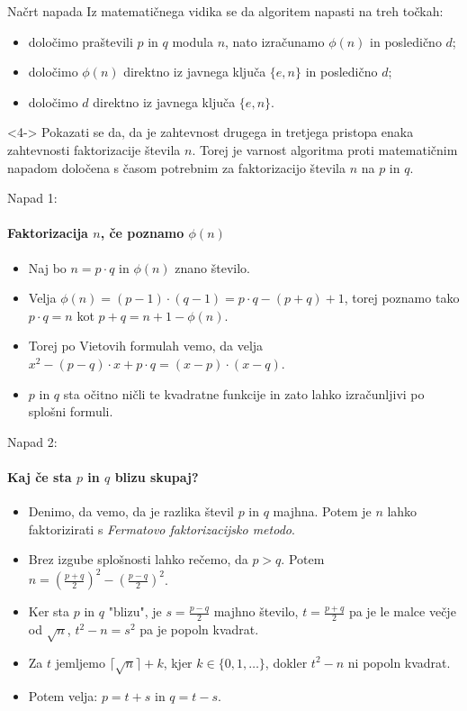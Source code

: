 \documentclass[a4paper, 12pt]{beamer} %
\begin{document}
\begin{frame}{Načrt napada}
Iz matematičnega vidika se da algoritem napasti na treh točkah:
\begin{itemize}[label=]
\item<1-> določimo praštevili $p$ in $q$ modula $n$, nato izračunamo $\phi(n)$ in posledično $d$;
\item<2-> določimo $\phi(n)$ direktno iz javnega ključa $\{ e, n \}$ in posledično $d$;
\item<3-> določimo $d$ direktno iz javnega ključa $\{ e, n \}$.
\end{itemize}
\begin{block}<4->{}
Pokazati se da, da je zahtevnost drugega in tretjega pristopa enaka zahtevnosti faktorizacije števila $n$. Torej je varnost algoritma proti matematičnim napadom določena s časom potrebnim za faktorizacijo števila $n$ na $p$ in $q$.
\end{block}
\end{frame}

\begin{frame}{Napad 1:}
\framesubtitle{Faktorizacija $n$, če poznamo $\phi(n)$}
\begin{itemize}[label=]
\item<1-> Naj bo $n = p \cdot q$ in $\phi(n)$ znano število.
\item<2-> Velja $\phi(n) = (p-1) \cdot (q-1) = p \cdot q - (p + q) + 1$, torej poznamo tako $p \cdot q = n$ kot $p + q = n + 1 - \phi(n)$.
\item<3-> Torej po Vietovih formulah vemo, da velja $x^2 - (p-q) \cdot x + p \cdot q = (x-p) \cdot (x-q).$
\item<4-> $p$ in $q$ sta očitno ničli te kvadratne funkcije in zato lahko izračunljivi po splošni formuli.
\end{itemize}
\end{frame}

\begin{frame}{Napad 2:}
\framesubtitle{Kaj če sta $p$ in $q$ blizu skupaj?}
\begin{itemize}[label=]
\item<1-> Denimo, da vemo, da je razlika števil $p$ in $q$ majhna. Potem je $n$ lahko faktorizirati s \emph{Fermatovo faktorizacijsko metodo}.
\item<2-> Brez izgube splošnosti lahko rečemo, da $p > q$. Potem $n = (\frac{p+q}{2})^2 - (\frac{p-q}{2})^2$.
\item<3-> Ker sta $p$ in $q$ "blizu", je $s=\frac{p-q}{2}$ majhno število, $t = \frac{p+q}{2}$ pa je le malce večje od $\sqrt{n}$, $t^2 - n = s^2$ pa je popoln kvadrat.
\item<4-> Za $t$ jemljemo $\lceil \sqrt{n} \rceil + k$, kjer $k \in \{ 0, 1, \dots \}$, dokler $t^2 - n$ ni popoln kvadrat.
\item<5-> Potem velja: $p = t + s$ in $q = t - s$.
\end{itemize}
\end{frame}
\end{document}
